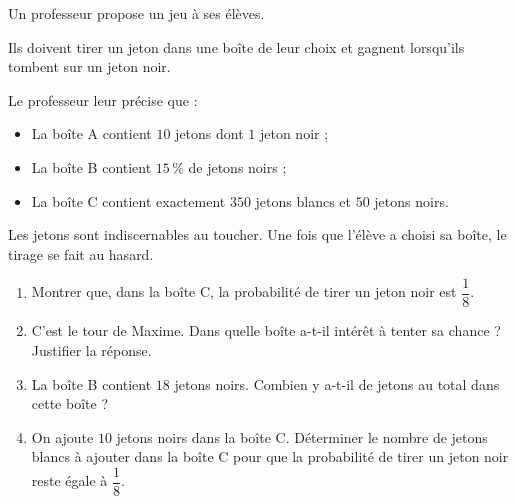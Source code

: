 \documentclass[exercice,a4]{thedocument}%
\begin{document}
%

\medskip

Un professeur propose un jeu à ses élèves.

Ils doivent tirer un jeton dans une boîte de leur choix et gagnent lorsqu'ils tombent sur un jeton noir.

Le professeur leur précise que :

\setlength\parindent{1cm}
\begin{itemize}
\item La boîte A contient $10$ jetons dont $1$ jeton noir ;
\item La boîte B contient $15$\,\% de jetons noirs ;
\item La boîte C contient exactement $350$ jetons blancs et $50$ jetons noirs.
\end{itemize}
\setlength\parindent{0cm}

\medskip

Les jetons sont indiscernables au toucher. Une fois que l'élève a choisi sa boîte, le tirage se fait au hasard.

\medskip

\begin{enumerate}
\item Montrer que, dans la boîte C, la probabilité de tirer un jeton noir est $\dfrac{1}{8}$.
\item C'est le tour de Maxime. Dans quelle boîte a-t-il intérêt à tenter sa chance ? Justifier la réponse.
\item La boîte B contient $18$ jetons noirs. Combien y a-t-il de jetons au total dans cette boîte  ? \item On ajoute $10$ jetons noirs dans la boîte C. Déterminer le nombre de jetons blancs à ajouter dans la boîte C pour que la probabilité de tirer un jeton noir reste égale à $\dfrac{1}{8}$.
\end{enumerate}

\bigskip

\showthesource
\end{document}
